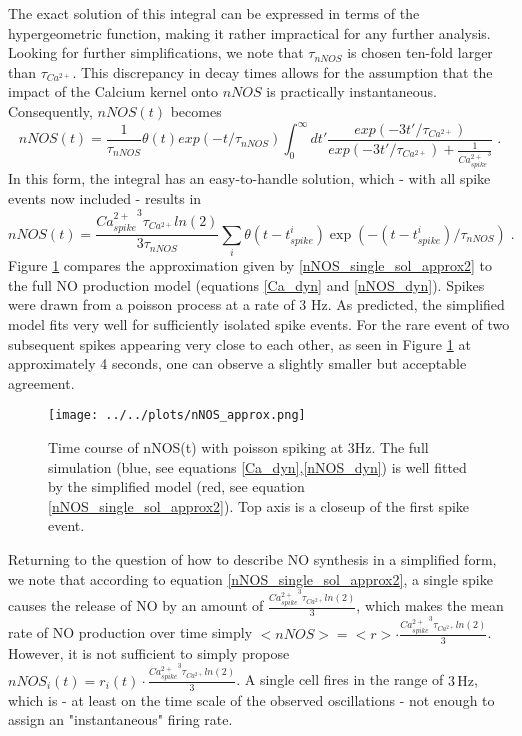 \documentclass[10pt,a4paper]{article}
\begin{document}
The exact solution of this integral can be expressed in terms of the hypergeometric function, making it rather impractical for any further analysis. Looking for further simplifications, we note that $\tau_{nNOS}$ is chosen ten-fold larger than $\tau_{Ca^{2+}}$. This discrepancy in decay times allows for the assumption that the impact of the Calcium kernel onto $nNOS$ is practically instantaneous. Consequently, $nNOS(t)$ becomes
\begin{equation}
nNOS(t) = \frac{1}{\tau_{nNOS}} \theta(t) exp(-t/\tau_{nNOS}) \int_{0}^\infty dt' \frac{exp(-3t'/\tau_{Ca^{2+}})}{exp(-3t'/\tau_{Ca^{2+}}) + \frac{1}{{Ca^{2+}_{spike}}^3}}\;.
\label{nNOS_single_sol_approx1}
\end{equation}
In this form, the integral has an easy-to-handle solution, which - with all spike events now included - results in
\begin{equation}
nNOS(t) = \frac{{Ca^{2+}_{spike}}^3 \tau_{Ca^{2+}}ln(2)}{3\tau_{nNOS}} \sum_i \theta(t-t^i_{spike}) \exp(-(t-t^i_{spike})/\tau_{nNOS})\;.
\label{nNOS_single_sol_approx2}
\end{equation}
Figure \ref{nNOS_approx_plot} compares the approximation given by \eqref{nNOS_single_sol_approx2} to the full NO production model (equations \eqref{Ca_dyn} and \eqref{nNOS_dyn}). Spikes were drawn from a poisson process at a rate of 3 Hz. As predicted, the simplified model fits very well for sufficiently isolated spike events. For the rare event of two subsequent spikes appearing very close to each other, as seen in Figure \ref{nNOS_approx_plot} at approximately 4 seconds, one can observe a slightly smaller but acceptable agreement.
\begin{figure}
\texttt{[image: ../../plots/nNOS\_approx.png]}
\caption{Time course of nNOS(t) with poisson spiking at 3Hz. The full simulation (blue, see equations \eqref{Ca_dyn},\eqref{nNOS_dyn}) is well fitted by the simplified model (red, see equation \eqref{nNOS_single_sol_approx2}). Top axis is a closeup of the first spike event.}
\label{nNOS_approx_plot}
\end{figure}

Returning to the question of how to describe NO synthesis in a simplified form, we note that according to equation \eqref{nNOS_single_sol_approx2}, a single spike causes the release of NO by an amount of $\frac{{Ca^{2+}_{spike}}^3 \tau_{Ca^{2+}}ln(2)}{3}$, which makes the mean rate of NO production over time simply $<nNOS> = <r> \cdot \frac{{Ca^{2+}_{spike}}^3 \tau_{Ca^{2+}}ln(2)}{3}$. However, it is not sufficient to simply propose $nNOS_i(t) = r_i(t) \cdot \frac{{Ca^{2+}_{spike}}^3 \tau_{Ca^{2+}}ln(2)}{3}$. A single cell fires in the range of $\mathrm{3\,Hz}$, which is - at least on the time scale of the observed oscillations - not enough to assign an "instantaneous" firing rate.
\end{document}
